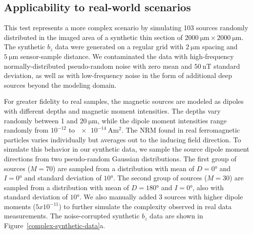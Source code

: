 \subsection{Applicability to real-world scenarios}

This test represents a more complex scenario by simulating 103 sources randomly distributed in the imaged area of a synthetic thin section of $\qty{2000}{\um} \times \qty{2000}{\um}$.
The synthetic $b_z$ data were generated on a regular grid with $\qty{2}{\um}$ spacing and $\qty{5}{\um}$ sensor-sample distance.
We contaminated the data with high-frequency normally-distributed pseudo-random noise with zero mean and $\qty{50}{\nano\tesla}$ standard deviation, as well as with low-frequency noise in the form of additional deep sources beyond the modeling domain.

For greater fidelity to real samples, the magnetic sources are modeled as dipoles with different depths and magnetic moment intensities.
The depths vary randomly between 1 and $\qty{20}{\um}$, while the dipole moment intensities range randomly from $10^{-12}$ to $\qty{e-14}{\ampere\m\squared}$.
The NRM found in real ferromagnetic particles varies individually but averages out to the inducing field direction.
To simulate this behavior in our synthetic data, we sample the source dipole moment directions from two pseudo-random Gaussian distributions.
The first group of sources ($M = 70$) are sampled from a distribution  with mean of $D = \ang{0}$ and $I = \ang{0}$ and standard deviation of $\ang{10}$.
The second group of sources ($M = 30$) are sampled from a distribution with mean of $D = \ang{180}$ and $I = \ang{0}$, also with standard deviation of $\ang{10}$. We also manually added 3 sources with higher dipole moments ($5x10^{-11}$) to further simulate the complexity observed in real data measurements. The noise-corrupted synthetic $b_z$ data are shown in Figure~\ref{complex-synthetic-data}a.

